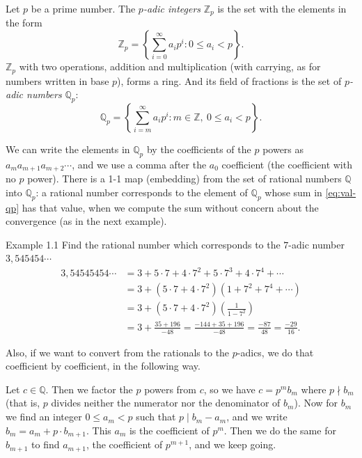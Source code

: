 \documentclass[11pt]{article}
\begin{document}
Let $p$ be a prime number. The \textit{$p$-adic integers} $\mathbb{Z}_p$ is the set with the elements in the form
\begin{equation}\label{eq:val-zp}
\mathbb{Z}_p = \left\{ \sum_{i=0}^{\infty} a_i p^i : 0 \leq a_i < p \right\}.
\end{equation}
$\mathbb{Z}_p$ with two operations, addition and multiplication (with carrying, as for numbers written in base $p$), forms a ring. And its field of fractions is the set of \textit{$p$-adic numbers} $\mathbb{Q}_p$:
\begin{equation}\label{eq:val-qp}
\mathbb{Q}_p = \left\{ \sum_{i=m}^\infty a_i p^i : m \in \mathbb{Z},\ 0 \leq a_i < p \right\}.
\end{equation}

We can write the elements in $\mathbb{Q}_p$ by the coefficients of the $p$ powers as $a_m a_{m+1} a_{m+2} \cdots$, and we use a comma after the $a_0$ coefficient (the coefficient with no $p$ power). There is a 1-1 map (embedding) from the set of rational numbers $\mathbb{Q}$ into $\mathbb{Q}_p$: a rational number corresponds to the element of $\mathbb{Q}_p$ whose sum in \eqref{eq:val-qp} has that value, when we compute the sum without concern about the convergence (as in the next example).

\begin{exbox}{Example 1.1}
Find the rational number which corresponds to the $7$-adic number $3,545454\cdots$
\[
\begin{aligned}
3,54545454\cdots &= 3 + 5\cdot 7 + 4\cdot 7^2 + 5\cdot 7^3 + 4\cdot 7^4 + \cdots \\
&= 3 + (5\cdot 7 + 4\cdot 7^2)(1 + 7^2 + 7^4 + \cdots) \\
&= 3 + (5\cdot 7 + 4\cdot 7^2)\left(\frac{1}{1-7^2}\right) \\
&= 3 + \frac{35+196}{-48} = \frac{-144+35+196}{-48} = \frac{-87}{48} = \frac{-29}{16}.
\end{aligned}
\]
\end{exbox}

Also, if we want to convert from the rationals to the $p$-adics, we do that coefficient by coefficient, in the following way.

Let $c \in \mathbb{Q}$. Then we factor the $p$ powers from $c$, so we have $c = p^m b_m$ where $p \nmid b_m$ (that is, $p$ divides neither the numerator nor the denominator of $b_m$). Now for $b_m$ we find an integer $0 \leq a_m < p$ such that $p \mid b_m - a_m$, and we write $b_m = a_m + p\cdot b_{m+1}$. This $a_m$ is the coefficient of $p^m$. Then we do the same for $b_{m+1}$ to find $a_{m+1}$, the coefficient of $p^{m+1}$, and we keep going.
\end{document}

